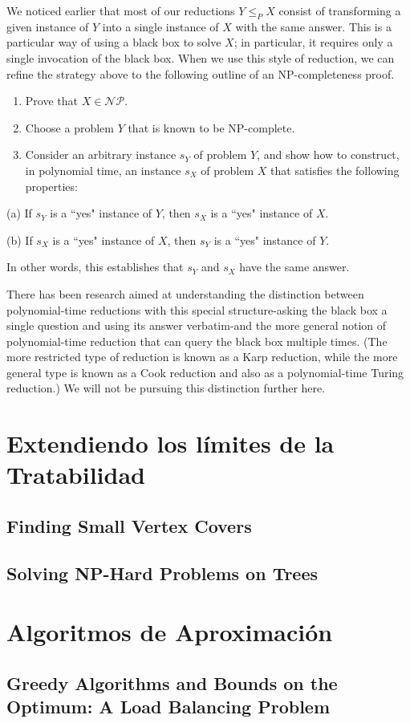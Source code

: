 \documentclass[a4paper, 12pt]{book}
\theoremstyle{dotless}
\begin{document}
We noticed earlier that most of our reductions $Y \leq_{P} X$ consist of transforming a given instance of $Y$ into a single instance of $X$ with the same answer. This is a particular way of using a black box to solve $X$; in particular, it requires only a single invocation of the black box. When we use this style of reduction, we can refine the strategy above to the following outline of an NP-completeness proof.

\begin{enumerate}
  \item Prove that $X \in \mathcal{N} \mathcal{P}$.

  \item Choose a problem $Y$ that is known to be NP-complete.

  \item Consider an arbitrary instance $s_{Y}$ of problem $Y$, and show how to construct, in polynomial time, an instance $s_{X}$ of problem $X$ that satisfies the following properties:

\end{enumerate}

(a) If $s_{Y}$ is a ``yes" instance of $Y$, then $s_{X}$ is a ``yes" instance of $X$.

(b) If $s_{X}$ is a ``yes" instance of $X$, then $s_{Y}$ is a ``yes" instance of $Y$.

In other words, this establishes that $s_{Y}$ and $s_{X}$ have the same answer.

There has been research aimed at understanding the distinction between polynomial-time reductions with this special structure-asking the black box a single question and using its answer verbatim-and the more general notion of polynomial-time reduction that can query the black box multiple times. (The more restricted type of reduction is known as a Karp reduction, while the more general type is known as a Cook reduction and also as a polynomial-time Turing reduction.) We will not be pursuing this distinction further here.








\chapter{Extendiendo los límites de la Tratabilidad}

\section{Finding Small Vertex Covers}

\section{Solving NP-Hard Problems on Trees}




\chapter{Algoritmos de Aproximación}

\section{Greedy Algorithms and Bounds on the Optimum: A Load Balancing Problem}
\end{document}
